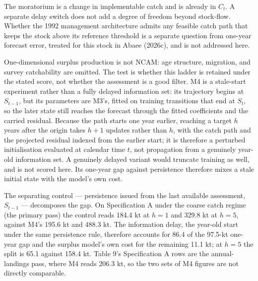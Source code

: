 \documentclass[11pt]{article}
\begin{document}
The moratorium is a change in implementable catch and is already in
\(C_t\). A separate delay switch does not add a degree of freedom beyond
stock-flow. Whether the 1992 management architecture admits any feasible
catch path that keeps the stock above its reference threshold is a
separate question from one-year forecast error, treated for this stock
in Abaee (2026c), and is not addressed
here.

One-dimensional surplus production is not NCAM: age structure,
migration, and survey catchability are omitted. The test is whether this
ladder is retained under the stated score, not whether the assessment is
a good filter. M4 is a stale-start experiment rather than a fully delayed information
set: its trajectory begins at \(S_{t-1}\), but its parameters are
M3's, fitted on training transitions that end at \(S_t\), so the
later state still reaches the forecast through the fitted coefficients
and the carried residual. Because the path starts one year earlier,
reaching a target \(h\) years after the origin takes \(h+1\) updates
rather than \(h\), with the catch path and the projected residual
indexed from the earlier start; it is therefore a perturbed
initialisation evaluated at calendar time \(t\), not propagation from a
genuinely year-old information set. A genuinely delayed variant would truncate
training as well, and is not scored here. Its one-year gap against
persistence therefore mixes a stale initial state with the model's own
cost.

The separating control --- persistence issued from the last available
assessment, \(S_{t-1}\) --- decomposes the gap. On Specification A under
the coarse catch regime (the primary pass) the control reads 184.4 kt at
\(h = 1\) and 329.8 kt at \(h = 5\), against M4's 195.6 kt and 488.3 kt.
The information delay, the year-old start under the same persistence
rule, therefore accounts for 86.4 of the 97.5-kt one-year gap and the
surplus model's own cost for the remaining 11.1 kt; at \(h = 5\) the
split is 65.1 against 158.4 kt. Table 9's Specification A rows are the
annual-landings pass, where M4 reads 206.3 kt, so the two sets of M4
figures are not directly comparable.
\end{document}
